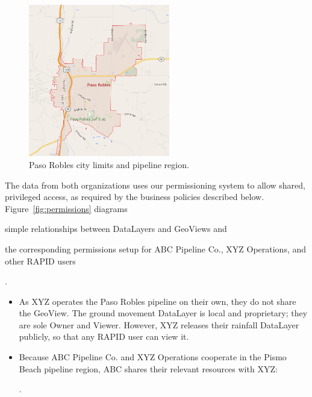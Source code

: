 \begin{figure}[ht]
    \centering
    \includegraphics[width=0.55\textwidth]{figures/paso.png}
    \caption{Paso Robles city limits and pipeline region.}
    \label{fig:paso}
\end{figure}

The data from both organizations uses our permissioning system to allow shared, privileged access, as required by the business policies described below. Figure~\ref{fig:permissions} diagrams  
\begin{enumerate*}[label=\itshape\alph*\upshape)]
\item simple relationships between DataLayers and GeoViews and
\item the corresponding permissions setup for ABC Pipeline Co., XYZ Operations, and other RAPID users
\end{enumerate*}.

\begin{itemize}
\item As XYZ operates the Paso Robles pipeline on their own, they do not share the GeoView. The ground movement DataLayer is local and proprietary; they are sole Owner and Viewer. However, XYZ releases their rainfall DataLayer publicly, so that any RAPID user can view it.
\item Because ABC Pipeline Co. and XYZ Operations cooperate in the Pismo Beach pipeline region, ABC shares their relevant resources with XYZ: .
\end{itemize}
 

